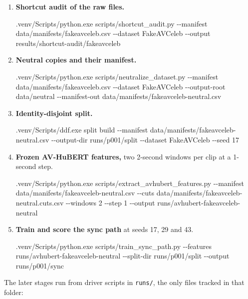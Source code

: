 \begin{enumerate}
    \item \textbf{Shortcut audit of the raw files.}\\
    {\small\ttfamily\raggedright .venv/Scripts/python.exe scripts/shortcut\_audit.py -{}-manifest data/manifests/fakeavceleb.csv -{}-dataset FakeAVCeleb -{}-output results/shortcut-audit/fakeavceleb\par}
    \item \textbf{Neutral copies and their manifest.}\\
    {\small\ttfamily\raggedright .venv/Scripts/python.exe scripts/neutralize\_dataset.py -{}-manifest data/manifests/fakeavceleb.csv -{}-dataset FakeAVCeleb -{}-output-root data/neutral -{}-manifest-out data/manifests/fakeavceleb-neutral.csv\par}
    \item \textbf{Identity-disjoint split.}\\
    {\small\ttfamily\raggedright .venv/Scripts/ddf.exe split build -{}-manifest data/manifests/fakeavceleb-neutral.csv -{}-output-dir runs/p001/split -{}-dataset FakeAVCeleb -{}-seed 17\par}
    \item \textbf{Frozen AV-HuBERT features,} two 2-second windows per clip at a 1-second step.\\
    {\small\ttfamily\raggedright .venv/Scripts/python.exe scripts/extract\_avhubert\_features.py -{}-manifest data/manifests/fakeavceleb-neutral.csv -{}-cuts data/manifests/fakeavceleb-neutral.cuts.csv -{}-windows 2 -{}-step 1 -{}-output runs/avhubert-fakeavceleb-neutral\par}
    \item \textbf{Train and score the sync path} at seeds 17, 29 and 43.\\
    {\small\ttfamily\raggedright .venv/Scripts/python.exe scripts/train\_sync\_path.py -{}-features runs/avhubert-fakeavceleb-neutral -{}-split-dir runs/p001/split -{}-output runs/p001/sync\par}
\end{enumerate}

The later stages run from driver scripts in \texttt{runs/}, the only files
tracked in that folder:

